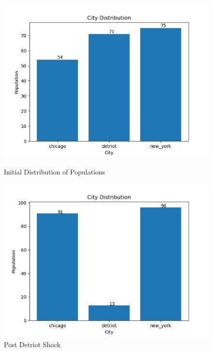 \documentclass[10pt]{article}
\begin{document}
\begin{figure}[h]
    \begin{minipage}{0.5\textwidth}
        \centering
        \includegraphics[width=\textwidth]{../simulations/graphs/city_pop.png}
        \caption{Initial Distribution of Populations}
        \label{city_pop}
    \end{minipage}%
    \begin{minipage}{0.5\textwidth}
        \centering
        \includegraphics[width=\textwidth]{../simulations/graphs/c_shock.png}
        \caption{Post Detriot Shock}
        \label{c_shock}
    \end{minipage}
\end{figure}
\end{document}
